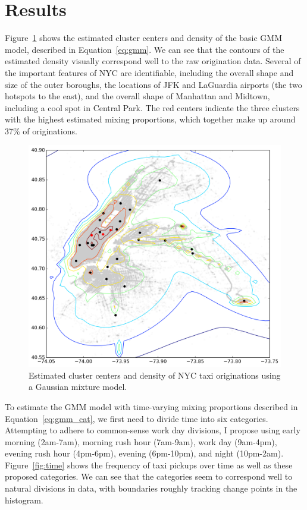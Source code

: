 \documentclass[12pt]{article}
\theoremstyle{definition}
\theoremstyle{algodesc}
\begin{document}
\section{Results}
Figure~\ref{fig:gmm_res} shows the estimated cluster centers and density of the basic GMM model, described in Equation~\ref{eq:gmm}. We can see that the contours of the estimated density visually correspond well to the raw origination data. Several of the important features of NYC are identifiable, including the overall shape and size of the outer boroughs, the locations of JFK and LaGuardia airports (the two hotspots to the east), and the overall shape of Manhattan and Midtown, including a cool spot in Central Park. The red centers indicate the three clusters with the highest estimated mixing proportions, which together make up around 37\% of originations.

\begin{figure}[tb] \centering
  \includegraphics[width=0.8\linewidth]{./include/gmm_res.png}
  \caption{Estimated cluster centers and density of NYC taxi originations using a Gaussian mixture model.}
  \label{fig:gmm_res}
\end{figure}

To estimate the GMM model with time-varying mixing proportions described in Equation~\ref{eq:gmm_cat}, we first need to divide time into six categories. Attempting to adhere to common-sense work day divisions, I propose using early morning (2am-7am), morning rush hour (7am-9am), work day (9am-4pm), evening rush hour (4pm-6pm), evening (6pm-10pm), and night (10pm-2am). Figure~\ref{fig:time} shows the frequency of taxi pickups over time as well as these proposed categories. We can see that the categories seem to correspond well to natural divisions in data, with boundaries roughly tracking change points in the histogram.
\end{document}
